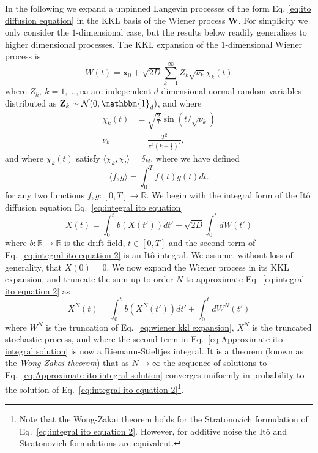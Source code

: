 In the following we expand a unpinned Langevin processes of the form Eq. \ref{eq:ito diffusion equation} in the KKL basis of the Wiener process $\mathbf{W}$. For simplicity we only consider the $1$-dimensional case, but the results below readily generalises to higher dimensional processes. The KKL expansion of the $1$-dimensional Wiener process is
\begin{equation} \label{eq:wiener kkl expansion}
	W(t) = \mathbf{x}_0 +\sqrt{2 D} \sum_{k=1}^\infty Z_k \sqrt{\nu_k} \chi_k(t)
\end{equation}
where $Z_k,\ k =1,\dots,\infty$ are independent $d$-dimensional normal random variables distributed as $\mathbf{Z}_k \sim \mathcal{N}(0, \mathbbm{1}_d)$, and where
\begin{subequations}
	\begin{align}
		\chi_k(t) & = \sqrt{\frac{2}{T}} \sin (t / \sqrt{\nu_k}) \\
		\nu_k & = \frac{T^2}{\pi^2 \left(k - \frac{1}{2} \right)^2},
	\end{align}
\end{subequations}
and where $\chi_k(t)$ satisfy $\langle \chi_k, \chi_l \rangle = \delta_{kl}$, where we have defined
\begin{equation}
	\langle f, g \rangle = \int_0^T f(t) g(t) dt.
\end{equation}
for any two functions $f, g : [0,T] \to \mathbb{R}$. We begin with the integral form of the It\^{o} diffusion equation Eq.~\ref{eq:integral ito equation}
\begin{equation} \label{eq:integral ito equation 2}
X(t) = \int_0^t b(X(t')) dt' + \sqrt{2D} \int_0^{t} d W(t')
\end{equation}
where $b : \mathbb{R} \to \mathbb{R}$ is the drift-field, $t \in [0, T]$ and the second term of Eq.~\ref{eq:integral ito equation 2} is an It\^{o} integral. We assume, without loss of generality, that $X(0) = 0$. We now expand the Wiener process in its KKL expansion, and truncate the sum up to order $N$ to approximate Eq.~\ref{eq:integral ito equation 2} as
\begin{equation} \label{eq:Approximate ito integral solution}
X^N(t) = \int_0^t b(X^N(t')) dt' + \int_0^t dW^N(t')
\end{equation}
where $W^N$ is the truncation of Eq.~\ref{eq:wiener kkl expansion}, $X^N$ is the truncated stochastic process, and where the second term in Eq.~\ref{eq:Approximate ito integral solution} is now a Riemann-Stieltjes integral. It is a theorem (known as the \textit{Wong-Zakai theorem}) \citep{wongConvergenceOrdinaryIntegrals1965, twardowskaWongZakaiApproximationsStochastic1996, frizMultidimensionalStochasticProcesses2010} that as $N\to\infty$ the sequence of solutions to Eq.~\ref{eq:Approximate ito integral solution} converges uniformly in probability to the solution of Eq.~\ref{eq:integral ito equation 2}\footnote{Note that the Wong-Zakai theorem holds for the Stratonovich formulation of Eq.~\ref{eq:integral ito equation 2}. However, for additive noise the It\^{o} and Stratonovich formulations are equivalent.}.



